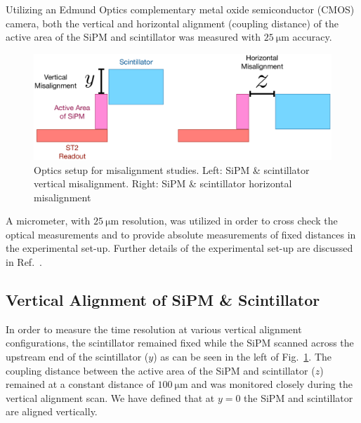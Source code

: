 Utilizing an Edmund Optics complementary metal oxide semiconductor (CMOS) camera, both the vertical and horizontal alignment (coupling distance) of the active area of the SiPM and scintillator was measured with $25~\mathrm{\mu m}$ accuracy.
	\begin{figure}[!htb]
		\centering
		\includegraphics[width=1.0\columnwidth]{misalignment/figs/st_misalignment}
		\caption{Optics setup for misalignment studies.  Left: SiPM \& scintillator vertical misalignment. Right: SiPM \& scintillator horizontal misalignment}
		\label{fig:sipm_va_optics}
	\end{figure}
A micrometer, with $25~\mathrm{\mu m}$ resolution, was utilized in order to cross check the optical measurements and to provide absolute measurements of fixed distances in the experimental set-up. Further details of the experimental set-up are discussed in Ref.~\cite{pooser16}.

\subsection{Vertical Alignment of SiPM \& Scintillator}
\label{sec:misalign_vert}


In order to measure the time resolution at various vertical alignment configurations, the scintillator remained fixed while the SiPM scanned across the upstream end of the scintillator ($y$) as can be seen in the left of Fig.~\ref{fig:sipm_va_optics}. The coupling distance between the active area of the SiPM and scintillator ($z$) remained at a constant distance of $\mathrm{100\ \mu m}$ and was monitored closely during the vertical alignment scan.  We have defined that at $y = 0$ the SiPM and scintillator are aligned vertically.  %

